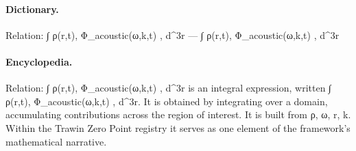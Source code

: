 \paragraph{Dictionary.}
Relation: ∫ ρ(r,t), Φ\_acoustic(ω,k,t) , d\textasciicircum{}3r — ∫ ρ(r,t), Φ\_acoustic(ω,k,t) , d\textasciicircum{}3r

\paragraph{Encyclopedia.}
Relation: ∫ ρ(r,t), Φ\_acoustic(ω,k,t) , d\textasciicircum{}3r is an integral expression, written ∫ ρ(r,t), Φ\_acoustic(ω,k,t) , d\textasciicircum{}3r. It is obtained by integrating over a domain, accumulating contributions across the region of interest. It is built from ρ, ω, r, k. Within the Trawin Zero Point registry it serves as one element of the framework's mathematical narrative.
